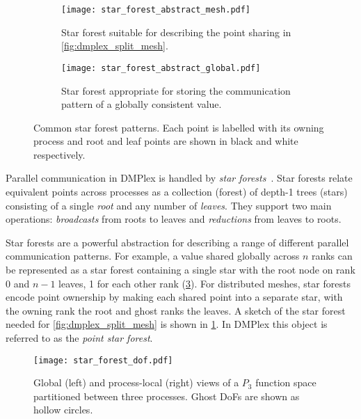 \documentclass[thesis]{subfiles}
\begin{document}
\begin{figure}
  \centering
  \begin{subfigure}[t]{.45\textwidth}
    \centering
    \texttt{[image: star\_forest\_abstract\_mesh.pdf]}
    \caption{Star forest suitable for describing the point sharing in \cref{fig:dmplex_split_mesh}.}
    \label{fig:star_forest_abstract_mesh}
  \end{subfigure}
  \hspace{1em}
  \begin{subfigure}[t]{.45\textwidth}
    \centering
    \texttt{[image: star\_forest\_abstract\_global.pdf]}
    \caption{Star forest appropriate for storing the communication pattern of a globally consistent value.}
    \label{fig:star_forest_abstract_global}
  \end{subfigure}
  \caption{
    Common star forest patterns.
    Each point is labelled with its owning process and root and leaf points are shown in black and white respectively.
  }
\end{figure}

Parallel communication in DMPlex is handled by \textit{star forests}~\cite{zhangPetscSFScalableCommunication2021}.
Star forests relate equivalent points across processes as a collection (forest) of depth-1 trees (stars) consisting of a single \emph{root} and any number of \emph{leaves}.
They support two main operations: \emph{broadcasts} from roots to leaves and \emph{reductions} from leaves to roots.

Star forests are a powerful abstraction for describing a range of different parallel communication patterns.
For example,  a value shared globally across $n$ ranks can be represented as a star forest containing a single star with the root node on rank 0 and $n-1$ leaves, 1 for each other rank (\cref{fig:star_forest_abstract_global}).
For distributed meshes, star forests encode point ownership by making each shared point into a separate star, with the owning rank the root and ghost ranks the leaves.
A sketch of the star forest needed for \cref{fig:dmplex_split_mesh} is shown in \cref{fig:star_forest_abstract_mesh}.
In DMPlex this object is referred to as the \emph{point star forest}.

\begin{figure}
  \centering
  \texttt{[image: star\_forest\_dof.pdf]}

  \caption{
    Global (left) and process-local (right) views of a $P_3$ function space partitioned between three processes.
    Ghost DoFs are shown as hollow circles.
  }
  \label{fig:dmplex_split_function_space}
\end{figure}
\end{document}
